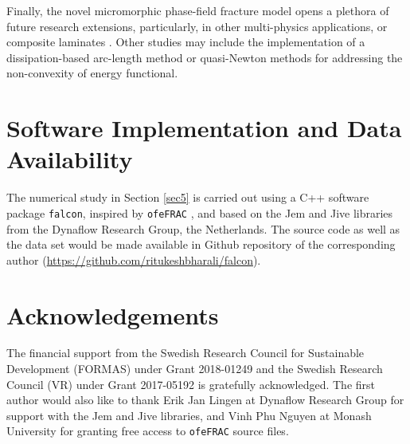 \documentclass[11pt]{article}
\begin{document}
Finally, the novel micromorphic phase-field fracture model opens a plethora of future research extensions, particularly, in other multi-physics applications, or composite laminates \cite{BUI2021107705}. Other studies may include the implementation of a dissipation-based arc-length method \cite{may2015numerical,BHARALI2022114927} or quasi-Newton methods \cite{KRISTENSEN2020102446,WU2020112704} for addressing the non-convexity of energy functional. 

\section{Software Implementation and Data Availability}

The numerical study in Section \ref{sec5} is carried out using a C++ software package \texttt{falcon}, inspired by \texttt{ofeFRAC} \cite{NGUYENTHANH2020102925}, and based on the Jem and Jive libraries from the Dynaflow Research Group, the Netherlands. The source code as well as the data set would be made available in Github repository of the corresponding author (\url{https://github.com/ritukeshbharali/falcon}).

\section*{Acknowledgements}

The financial support from the Swedish Research Council for Sustainable Development (FORMAS) under Grant 2018-01249 and the Swedish Research Council (VR) under Grant 2017-05192 is gratefully acknowledged. The first author would also like to thank Erik Jan Lingen at Dynaflow Research Group for support with the Jem and Jive libraries, and Vinh Phu Nguyen at Monash University for granting free access to \texttt{ofeFRAC} source files.


\printbibliography
\end{document}
